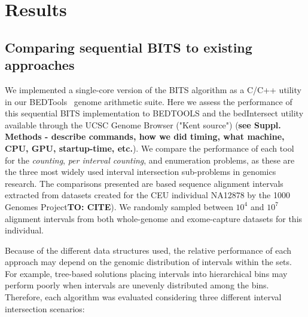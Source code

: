 \documentclass{bioinfo}
\begin{document}
	

	\section{Results}
	
	\subsection{Comparing sequential BITS to existing approaches}
	We implemented a single-core version of the BITS algorithm as a C/C++ utility 
	in our BEDTools~\citep{quinlan2010} genome arithmetic suite.
	Here we assess the performance of this sequential BITS implementation to BEDTOOLS and 
	the bedIntersect utility available through the UCSC Genome Browser ("Kent source") \citep{kent2002} 
	(\textbf{see Suppl. Methods - describe commands, how we did timing, what machine, CPU, GPU, startup-time, etc.}).
	We compare the performance of each tool for the \emph{counting}, \emph{per interval counting}, 
	and enumeration problems, as these are the three most widely used interval intersection sub-problems in genomics research. 
	The comparisons presented are based sequence alignment intervals extracted from datasets created 
	for the CEU individual NA12878 by the 1000 Genomes Project\textbf{TO: CITE}).  We randomly sampled 
	between $10^4$ and $10^7$ alignment intervals from both whole-genome and exome-capture datasets for this individual.
	
	Because of the different data structures used, the relative performance of each 
	approach may depend on the genomic distribution of intervals within the sets.  For example, 
	tree-based solutions placing intervals into hierarchical bins may perform poorly when intervals are 
	unevenly distributed among the bins. Therefore, each algorithm was evaluated 
	considering three different interval intersection scenarios:
\end{document}
